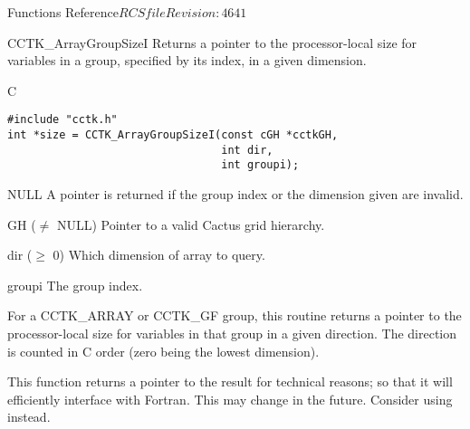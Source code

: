 \begin{cactuspart}{ Functions Reference}{$RCSfile$}{$Revision: 4641 $}
\begin{FunctionDescription}{CCTK\_ArrayGroupSizeI}{}
\label{CCTK-ArrayGroupSizeI}
Returns a pointer to the processor-local size for variables in a
group, specified by its index, in a given dimension.
\begin{SynopsisSection}
\begin{Synopsis}{C}
\begin{verbatim}
#include "cctk.h"
int *size = CCTK_ArrayGroupSizeI(const cGH *cctkGH,
                                 int dir,
                                 int groupi);
\end{verbatim}
\end{Synopsis}
\end{SynopsisSection}

\begin{ResultSection}
\begin{Result}{NULL}
A  pointer is returned if the group index or the dimension
given are invalid.
\end{Result}
\end{ResultSection}

\begin{ParameterSection}
\begin{Parameter}{GH ($\ne$ NULL)}
Pointer to a valid Cactus grid hierarchy.
\end{Parameter}
\begin{Parameter}{dir ($\ge$ 0)}
Which dimension of array to query.
\end{Parameter}
\begin{Parameter}{groupi}
The group index.
\end{Parameter}
\end{ParameterSection}

\begin{Discussion}
For a CCTK\_ARRAY or CCTK\_GF group, this routine returns a pointer to
the processor-local size for variables in that group in a given
direction. The direction is counted in C order (zero being the lowest
dimension).

This function returns a pointer to the result for technical reasons;
so that it will efficiently interface with Fortran.  This may change
in the future.  Consider using  instead.
\end{Discussion}


\end{FunctionDescription}
\end{cactuspart}
